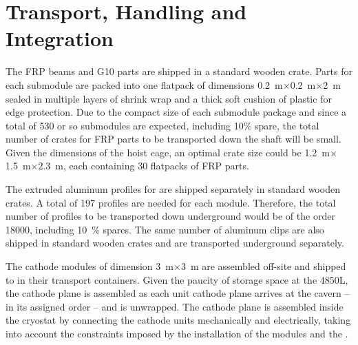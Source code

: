 \section{Transport, Handling and Integration}
\label{sec:fddp-hv-install-transport}


The  FRP beams and G10 parts are shipped in a standard wooden crate.  Parts for each submodule are packed into one %
flatpack of dimensions \SI{0.2}{m}$\times$\SI{0.2}{m}$\times$\SI{2}{m} sealed in multiple layers of shrink wrap and a thick soft cushion of plastic for edge protection.   Due to the compact size of each submodule package and since a total of \num{530} or so submodules are expected, including 10\% spare, the total number of crates for FRP parts to be transported down the shaft will be small. Given the dimensions of the hoist cage, an optimal crate size could be \SI{1.2}{m}$\times$\SI{1.5}{m}$\times$\SI{2.3}{m}, each containing \num{30} flatpacks of FRP parts.


The extruded aluminum profiles for  are shipped separately in  standard wooden crates.  A total of \num{197} profiles are needed for each \tpcheight module. Therefore, the total number of profiles to be transported down underground would be of the order \num{18000}, including \SI{10}{\%} spares.  The same number of aluminum clips are also shipped in standard wooden crates and are transported underground separately. 


The cathode modules of dimension  \SI{3}{m}$\times$\SI{3}{m} are assembled off-site and shipped to \surf in their transport containers. Given the paucity of storage space at the 4850L, the cathode plane is assembled as each unit cathode plane arrives at the cavern -- in its assigned order -- and is unwrapped. The cathode plane is assembled inside the cryostat by connecting the cathode units mechanically and electrically, taking into account the constraints imposed by the installation of the  modules and the . 
%

